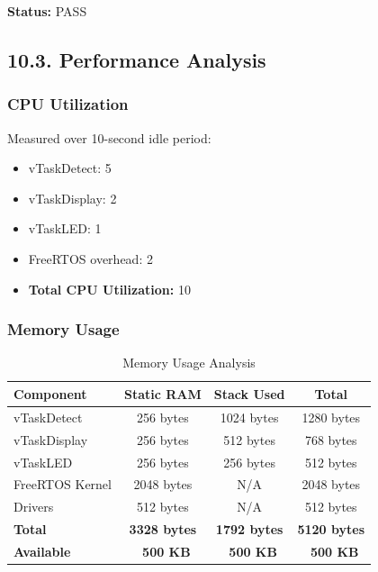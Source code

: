 \documentclass[12pt]{article}
\begin{document}
\textbf{Status:} PASS

\subsection*{10.3. Performance Analysis}

\subsubsection*{CPU Utilization}

Measured over 10-second idle period:

\begin{itemize}
    \item vTaskDetect: 5%
    \item vTaskDisplay: 2%
    \item vTaskLED: 1%
    \item FreeRTOS overhead: 2%
    \item \textbf{Total CPU Utilization:} 10%
\end{itemize}

\subsubsection*{Memory Usage}

\begin{table}[H]
    \centering
    \caption{Memory Usage Analysis}
    \label{tab:memory-usage}
    \begin{tabular}{|l|c|c|c|}
        \hline
        \textbf{Component} & \textbf{Static RAM} & \textbf{Stack Used} & \textbf{Total} \\
        \hline
        vTaskDetect & 256 bytes & 1024 bytes & 1280 bytes \\
        \hline
        vTaskDisplay & 256 bytes & 512 bytes & 768 bytes \\
        \hline
        vTaskLED & 256 bytes & 256 bytes & 512 bytes \\
        \hline
        FreeRTOS Kernel & 2048 bytes & N/A & 2048 bytes \\
        \hline
        Drivers & 512 bytes & N/A & 512 bytes \\
        \hline
        \textbf{Total} & \textbf{3328 bytes} & \textbf{1792 bytes} & \textbf{5120 bytes} \\
        \hline
        \textbf{Available} & \textbf{~500 KB} & \textbf{~500 KB} & \textbf{~500 KB} \\
        \hline
    \end{tabular}
\end{table}
\end{document}
